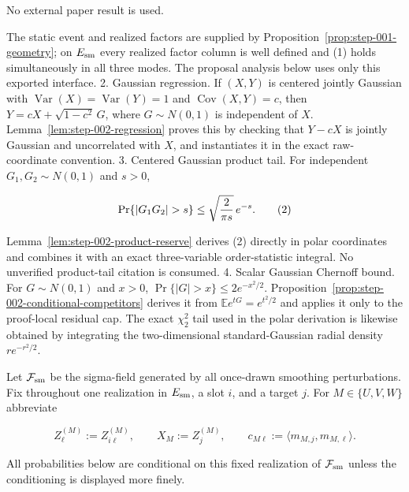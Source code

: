 No external paper result is used.

The static event and realized factors are supplied by
Proposition~\ref{prop:step-001-geometry}; on $E_{\rm sm}$ every realized
factor column is well defined and (1) holds simultaneously in all three
modes. The proposal analysis below uses only this exported interface.
2. Gaussian regression. If $(X,Y)$ is centered jointly Gaussian with
   $\operatorname{Var}(X)=\operatorname{Var}(Y)=1$ and
   $\operatorname{Cov}(X,Y)=c$, then
   $Y=cX+\sqrt{1-c^2}\,G$, where $G\sim N(0,1)$ is independent of $X$.
   Lemma~\ref{lem:step-002-regression} proves this by checking that
   $Y-cX$ is jointly Gaussian and uncorrelated with $X$, and instantiates it
   in the exact raw-coordinate convention.
3. Centered Gaussian product tail. For independent $G_1,G_2\sim N(0,1)$
   and $s>0$,

   \[
   \Pr\{|G_1G_2|>s\}
   \le \sqrt{2\over\pi s}\,e^{-s}.
   \tag{2}
   \]

   Lemma~\ref{lem:step-002-product-reserve} derives (2) directly in polar
   coordinates and combines it with an exact three-variable order-statistic
   integral. No unverified product-tail citation is consumed.
4. Scalar Gaussian Chernoff bound. For $G\sim N(0,1)$ and $x>0$,
   $\Pr\{|G|>x\}\le2e^{-x^2/2}$.
   Proposition~\ref{prop:step-002-conditional-competitors} derives it from
   $\mathbb E e^{tG}=e^{t^2/2}$ and applies it only to the proof-local
   residual cap. The exact $\chi^2_2$ tail used in the polar derivation is
   likewise obtained by integrating the two-dimensional standard-Gaussian
   radial density $re^{-r^2/2}$.

Let $\mathcal F_{\rm sm}$ be the sigma-field generated by all once-drawn
smoothing perturbations. Fix throughout one realization in $E_{\rm sm}$, a
slot $i$, and a target $j$. For $M\in\{U,V,W\}$ abbreviate

\[
Z_{\ell}^{(M)}:=Z_{i\ell}^{(M)},\qquad
X_M:=Z_j^{(M)},\qquad
c_{M\ell}:=\langle m_{M,j},m_{M,\ell}\rangle .
\tag{3}
\]

All probabilities below are conditional on this fixed realization of
$\mathcal F_{\rm sm}$ unless the conditioning is displayed more finely.


